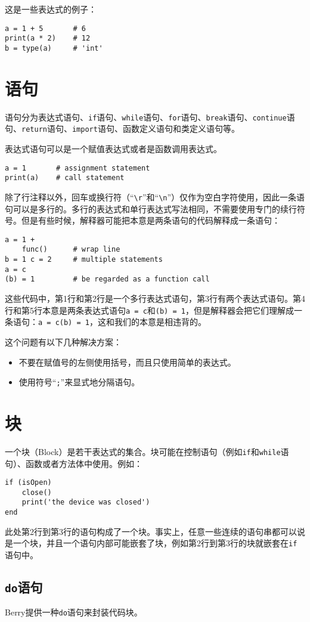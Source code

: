 这是一些表达式的例子：
\begin{lstlisting}[language=berry, numbers=none]
a = 1 + 5       # 6
print(a * 2)    # 12
b = type(a)     # 'int'
\end{lstlisting}

\section{语句}

语句分为表达式语句、\texttt{if}语句、\texttt{while}语句、\texttt{for}语句、\texttt{break}语句、\texttt{continue}语句、\texttt{return}语句、\texttt{import}语句、函数定义语句和类定义语句等。

表达式语句可以是一个赋值表达式或者是函数调用表达式。
\begin{lstlisting}[language=berry, numbers=none]
a = 1       # assignment statement
print(a)    # call statement
\end{lstlisting}

除了行注释以外，回车或换行符（``\texttt{\textbackslash r}''和``\texttt{\textbackslash n}''）仅作为空白字符使用，因此一条语句可以是多行的。多行的表达式和单行表达式写法相同，不需要使用专门的续行符号。但是有些时候，解释器可能把本意是两条语句的代码解释成一条语句：
\begin{lstlisting}[language=berry]
a = 1 +
    func()      # wrap line
b = 1 c = 2     # multiple statements
a = c
(b) = 1         # be regarded as a function call
\end{lstlisting}

这些代码中，第1行和第2行是一个多行表达式语句，第3行有两个表达式语句。第4行和第5行本意是两条表达式语句\texttt{a = c}和\texttt{(b) = 1}，但是解释器会把它们理解成一条语句：\texttt{a = c(b) = 1}，这和我们的本意是相违背的。

这个问题有以下几种解决方案：

\begin{itemize}
    \item 不要在赋值号的左侧使用括号，而且只使用简单的表达式。
    \item 使用符号``\texttt{;}''来显式地分隔语句。
\end{itemize}

\section{块}

一个块（Block）是若干表达式的集合。块可能在控制语句（例如\texttt{if}和\texttt{while}语句）、函数或者方法体中使用。例如：
\begin{lstlisting}[language=berry]
if (isOpen)
    close()
    print('the device was closed')
end
\end{lstlisting}

此处第2行到第3行的语句构成了一个块。事实上，任意一些连续的语句串都可以说是一个块，并且一个语句内部可能嵌套了块，例如第2行到第3行的块就嵌套在\texttt{if}语句中。

\subsection{\texttt{do}语句}

Berry提供一种\texttt{do}语句来封装代码块。
